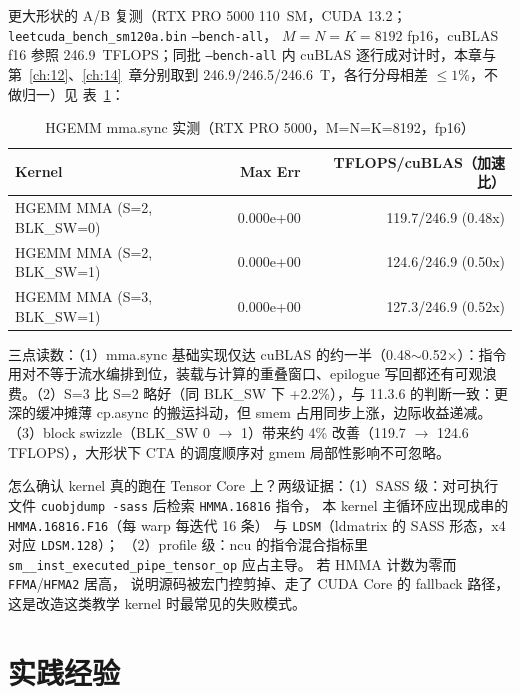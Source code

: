 更大形状的 A/B 复测（RTX PRO 5000 110~SM，CUDA 13.2；
\texttt{leetcuda\_\allowbreak{}bench\_\allowbreak{}sm120a.\allowbreak{}bin}
\texttt{--bench-all}，
$M{=}N{=}K{=}8192$ fp16，cuBLAS f16 参照 246.9~TFLOPS；同批 \texttt{--bench-all} 内 cuBLAS 逐行成对计时，本章与第~\ref{ch:12}、\ref{ch:14}~章分别取到 246.9/246.5/246.6~T，各行分母相差 $\le1\%$，不做归一）见
表~\ref{tab:ch11-perf}：

\begin{table}[H]
\centering
\caption{HGEMM mma.sync 实测（RTX PRO 5000，M=N=K=8192，fp16）}
\label{tab:ch11-perf}
\small
\begin{tabular}{lrr}
\toprule
Kernel & Max Err & TFLOPS/cuBLAS（加速比） \\
\midrule
HGEMM MMA (S=2, BLK\_SW=0) & 0.000e+00 & 119.7/246.9 (0.48x) \\
HGEMM MMA (S=2, BLK\_SW=1) & 0.000e+00 & 124.6/246.9 (0.50x) \\
HGEMM MMA (S=3, BLK\_SW=1) & 0.000e+00 & 127.3/246.9 (0.52x) \\
\bottomrule
\end{tabular}
\end{table}

三点读数：（1）mma.sync 基础实现仅达 cuBLAS 的约一半（0.48$\sim$0.52$\times$）：指令用对不等于流水编排到位，装载与计算的重叠窗口、epilogue 写回都还有可观浪费。（2）S=3 比 S=2 略好（同 BLK\_SW 下 +2.2\%），与 11.3.6 的判断一致：更深的缓冲摊薄 cp.async 的搬运抖动，但 smem 占用同步上涨，边际收益递减。（3）block swizzle（BLK\_SW 0 $\to$ 1）带来约 4\% 改善（119.7 $\to$ 124.6 TFLOPS），大形状下 CTA 的调度顺序对 gmem 局部性影响不可忽略。

怎么确认 kernel 真的跑在 Tensor Core 上？两级证据：（1）SASS 级：对可执行文件
\texttt{cuobjdump -sass} 后检索 \texttt{HMMA.16816} 指令，
本 kernel 主循环应出现成串的 \texttt{HMMA.16816.F16}（每 warp 每迭代 16 条）
与 \texttt{LDSM}（ldmatrix 的 SASS 形态，x4 对应 \texttt{LDSM.128}）；
（2）profile 级：ncu 的指令混合指标里
\texttt{sm\_\allowbreak{}\_\allowbreak{}inst\_\allowbreak{}executed\_\allowbreak{}pipe\_\allowbreak{}tensor\_\allowbreak{}op} 应占主导。
若 HMMA 计数为零而 \texttt{FFMA}/\texttt{HFMA2} 居高，
说明源码被宏门控剪掉、走了 CUDA Core 的 fallback 路径，
这是改造这类教学 kernel 时最常见的失败模式。

\section{实践经验}

